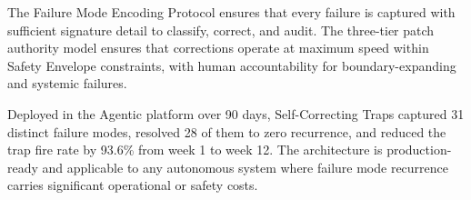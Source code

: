 \documentclass[12pt]{article}
\begin{document}
The Failure Mode Encoding Protocol ensures that every failure is captured with sufficient signature detail to classify, correct, and audit. The three-tier patch authority model ensures that corrections operate at maximum speed within Safety Envelope constraints, with human accountability for boundary-expanding and systemic failures.

Deployed in the Agentic platform over 90 days, Self-Correcting Traps captured 31 distinct failure modes, resolved 28 of them to zero recurrence, and reduced the trap fire rate by 93.6\% from week 1 to week 12. The architecture is production-ready and applicable to any autonomous system where failure mode recurrence carries significant operational or safety costs.



\end{document}

